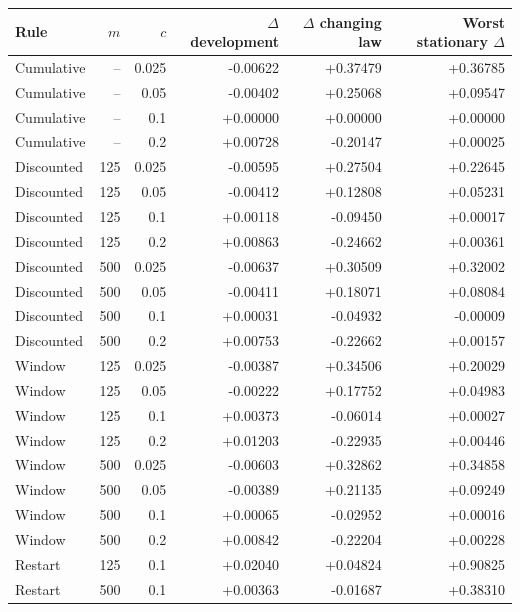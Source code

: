 \begin{tabular}{lrrrrr}\toprule
Rule & $m$ & $c$ & $\Delta$ development & $\Delta$ changing law & Worst stationary $\Delta$\\\midrule
Cumulative & -- & 0.025 & -0.00622 & +0.37479 & +0.36785\\
Cumulative & -- & 0.05 & -0.00402 & +0.25068 & +0.09547\\
Cumulative & -- & 0.1 & +0.00000 & +0.00000 & +0.00000\\
Cumulative & -- & 0.2 & +0.00728 & -0.20147 & +0.00025\\
Discounted & 125 & 0.025 & -0.00595 & +0.27504 & +0.22645\\
Discounted & 125 & 0.05 & -0.00412 & +0.12808 & +0.05231\\
Discounted & 125 & 0.1 & +0.00118 & -0.09450 & +0.00017\\
Discounted & 125 & 0.2 & +0.00863 & -0.24662 & +0.00361\\
Discounted & 500 & 0.025 & -0.00637 & +0.30509 & +0.32002\\
Discounted & 500 & 0.05 & -0.00411 & +0.18071 & +0.08084\\
Discounted & 500 & 0.1 & +0.00031 & -0.04932 & -0.00009\\
Discounted & 500 & 0.2 & +0.00753 & -0.22662 & +0.00157\\
Window & 125 & 0.025 & -0.00387 & +0.34506 & +0.20029\\
Window & 125 & 0.05 & -0.00222 & +0.17752 & +0.04983\\
Window & 125 & 0.1 & +0.00373 & -0.06014 & +0.00027\\
Window & 125 & 0.2 & +0.01203 & -0.22935 & +0.00446\\
Window & 500 & 0.025 & -0.00603 & +0.32862 & +0.34858\\
Window & 500 & 0.05 & -0.00389 & +0.21135 & +0.09249\\
Window & 500 & 0.1 & +0.00065 & -0.02952 & +0.00016\\
Window & 500 & 0.2 & +0.00842 & -0.22204 & +0.00228\\
Restart & 125 & 0.1 & +0.02040 & +0.04824 & +0.90825\\
Restart & 500 & 0.1 & +0.00363 & -0.01687 & +0.38310\\
\bottomrule\end{tabular}
